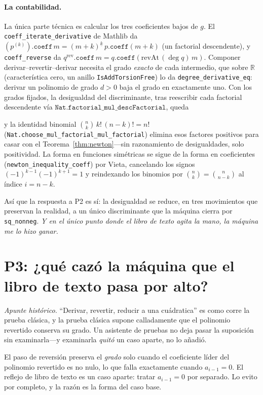 \documentclass[11pt]{article}
\newcommand{\lean}[1]{\texttt{#1}}
\newcommand{\R}{\mathbb{R}}
\newcommand{\keyeq}[1]{\begin{center}\keybox{$\displaystyle #1$}\end{center}}
\begin{document}
\paragraph{La contabilidad.} La \'unica parte t\'ecnica es calcular los tres coeficientes bajos de
$g$. El \lean{coeff\_iterate\_derivative} de Mathlib da $(p^{(k)}).\mathtt{coeff}\,m=
(m{+}k)^{\underline{k}}\,p.\mathtt{coeff}(m{+}k)$ (un factorial descendente), y \lean{coeff\_reverse}
da $q^{\mathrm{rev}}.\mathtt{coeff}\,m=q.\mathtt{coeff}(\mathrm{revAt}\,(\deg q)\,m)$. Componer
derivar--revertir--derivar necesita el grado \emph{exacto} de cada intermedio, que sobre $\R$
(caracter\'istica cero, un anillo \lean{IsAddTorsionFree}) lo da \lean{degree\_derivative\_eq}:
derivar un polinomio de grado $d{>}0$ baja el grado en exactamente uno. Con los grados fijados, la
desigualdad del discriminante, tras reescribir cada factorial descendente v\'ia
$\lean{Nat.factorial\_mul\_descFactorial}$, queda
\keyeq{\bigl((N-1)!\,i!\bigr)^2\,a_i^2\;\ge\;N!\,(N-2)!\,(i-1)!\,(i+1)!\;a_{i-1}a_{i+1},}
y la identidad binomial $\binom{n}{k}\,k!\,(n-k)!=n!$
(\lean{Nat.choose\_mul\_factorial\_mul\_factorial}) elimina esos factores positivos para casar con
el Teorema~\ref{thm:newton}---sin razonamiento de desigualdades, solo positividad. La forma en
funciones sim\'etricas se sigue de la forma en coeficientes (\lean{newton\_inequality\_coeff}) por
Vieta, cancelando los signos $(-1)^{k-1}(-1)^{k+1}=1$ y reindexando los binomios por
$\binom{n}{k}=\binom{n}{n-k}$ al \'indice $i=n-k$.

As\'i que la respuesta a P2 es s\'i: la desigualdad se reduce, en tres movimientos que preservan la
realidad, a un \'unico discriminante que la m\'aquina cierra por \lean{sq\_nonneg}. \emph{Y en el
\'unico punto donde el libro de texto agita la mano, la m\'aquina me lo hizo ganar.}

\section{P3: ¿qu\'e caz\'o la m\'aquina que el libro de texto pasa por alto?}\label{sec:caught}

\emph{Apunte hist\'orico.} ``Derivar, revertir, reducir a una cu\'adratica'' es como corre la prueba
cl\'asica, y la prueba cl\'asica supone calladamente que el polinomio revertido conserva su grado.
Un asistente de pruebas no deja pasar la suposici\'on sin examinarla---y examinarla \emph{quit\'o} un
caso aparte, no lo a\~nadi\'o.

El paso de reversi\'on preserva el \emph{grado} solo cuando el coeficiente l\'ider del polinomio
revertido es no nulo, lo que falla exactamente cuando $a_{i-1}=0$. El reflejo de libro de texto es un
caso aparte: tratar $a_{i-1}=0$ por separado. Lo evito por completo, y la raz\'on es la forma del
caso base.
\end{document}
